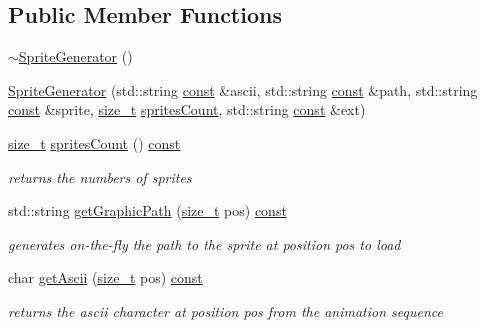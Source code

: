 \subsection*{Public Member Functions}
\begin{DoxyCompactItemize}
\item 
\hyperlink{classarcade_1_1_sprite_generator_a09a27458ab874057ee9845b8d82ce919}{$\sim$\-Sprite\-Generator} ()
\item 
\hyperlink{classarcade_1_1_sprite_generator_aa76a77bb463522c84b4921e7aaaec2bb}{Sprite\-Generator} (std\-::string \hyperlink{term__entry_8h_a57bd63ce7f9a353488880e3de6692d5a}{const} \&ascii, std\-::string \hyperlink{term__entry_8h_a57bd63ce7f9a353488880e3de6692d5a}{const} \&path, std\-::string \hyperlink{term__entry_8h_a57bd63ce7f9a353488880e3de6692d5a}{const} \&sprite, \hyperlink{nc__alloc_8h_a7b60c5629e55e8ec87a4547dd4abced4}{size\-\_\-t} \hyperlink{classarcade_1_1_sprite_generator_a5ee1f7ede27cc81e6275f95c74ff1a87}{sprites\-Count}, std\-::string \hyperlink{term__entry_8h_a57bd63ce7f9a353488880e3de6692d5a}{const} \&ext)
\item 
\hyperlink{nc__alloc_8h_a7b60c5629e55e8ec87a4547dd4abced4}{size\-\_\-t} \hyperlink{classarcade_1_1_sprite_generator_a5ee1f7ede27cc81e6275f95c74ff1a87}{sprites\-Count} () \hyperlink{term__entry_8h_a57bd63ce7f9a353488880e3de6692d5a}{const} 
\begin{DoxyCompactList}\small\item\em returns the numbers of sprites \end{DoxyCompactList}\item 
std\-::string \hyperlink{classarcade_1_1_sprite_generator_a9c058302f2d09bc39d0555444cf65e02}{get\-Graphic\-Path} (\hyperlink{nc__alloc_8h_a7b60c5629e55e8ec87a4547dd4abced4}{size\-\_\-t} pos) \hyperlink{term__entry_8h_a57bd63ce7f9a353488880e3de6692d5a}{const} 
\begin{DoxyCompactList}\small\item\em generates on-\/the-\/fly the path to the sprite at position pos to load \end{DoxyCompactList}\item 
char \hyperlink{classarcade_1_1_sprite_generator_acfc546e8824b9530f4591b7b438f1a38}{get\-Ascii} (\hyperlink{nc__alloc_8h_a7b60c5629e55e8ec87a4547dd4abced4}{size\-\_\-t} pos) \hyperlink{term__entry_8h_a57bd63ce7f9a353488880e3de6692d5a}{const} 
\begin{DoxyCompactList}\small\item\em returns the ascii character at position pos from the animation sequence \end{DoxyCompactList}\end{DoxyCompactItemize}


